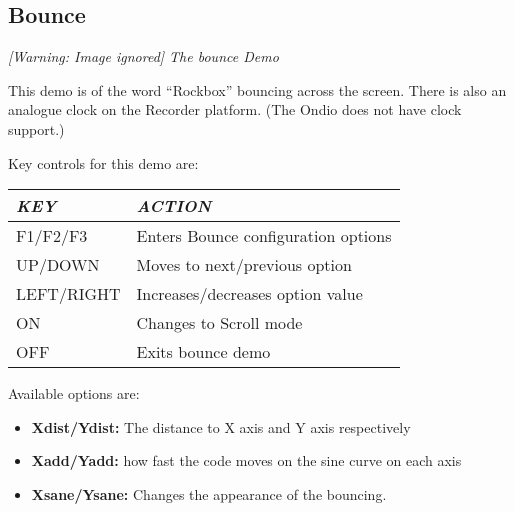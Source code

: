 \subsection{Bounce}
{\centering\itshape
  [Warning: Image ignored] %
 \newline
The bounce Demo
\par}

This demo is of the word ``Rockbox'' bouncing across the screen.  There
is also an analogue clock on the Recorder platform.  (The Ondio does
not have clock support.)

Key controls for this demo are:

\begin{center}\begin{tabular}{|p{3.169cm}|p{8.069cm}|}
\hline
{\centering\bfseries\itshape
KEY
\par}
&
{\centering\bfseries\itshape
ACTION
\par}
\\\hline
{\centering
F1/F2/F3
\par}
&
Enters Bounce configuration options
\\\hline
{\centering
UP/DOWN
\par}
&
Moves to next/previous option
\\\hline
{\centering
LEFT/RIGHT
\par}
&
Increases/decreases option value
\\\hline
{\centering
ON
\par}
&
Changes to Scroll mode
\\\hline
{\centering
OFF
\par}
&
Exits bounce demo
\\\hline
\end{tabular}\end{center}
Available options are:

\begin{itemize}
\item \textbf{Xdist/Ydist:} The distance to X axis and Y axis
respectively
\item \textbf{Xadd/Yadd:} how fast the code moves on the sine curve on
each axis
\item \textbf{Xsane/Ysane:} Changes the appearance of the bouncing.
\end{itemize}


